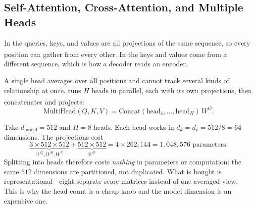 \subsection{Self-Attention, Cross-Attention, and Multiple Heads}

In  the queries, keys, and values are all projections of
the same sequence, so every position can gather from every
other\textsuperscript{\cite[][p.~79]{fleuretLittleBookDeep}}. In
 the keys and values come from a different sequence,
which is how a decoder reads an encoder.

A single head averages over all positions and cannot track several kinds of
relationship at once.  runs $H$ heads in
parallel, each with its own projections, then concatenates and
projects\textsuperscript{\cite[][pp.~4--5]{vaswaniAttentionAllYou2023}}:
\begin{equation}
  \mathrm{MultiHead}(Q,K,V)
  = \mathrm{Concat}(\mathrm{head}_1,\dots,\mathrm{head}_H)\,W^O .
  \label{eq:dl-multihead}
\end{equation}

\begin{workedexample}
Take $d_{\text{model}} = 512$ and $H = 8$ heads. Each head works in
$d_k = d_v = 512/8 = 64$ dimensions. The projections cost
\[
  \underbrace{3 \times 512 \times 512}_{W^Q, W^K, W^V}
  + \underbrace{512 \times 512}_{W^O}
  = 4 \times 262{,}144 = 1{,}048{,}576 \text{ parameters.}
\]
Splitting into heads therefore costs \emph{nothing} in parameters or
computation: the same $512$ dimensions are partitioned, not duplicated. What is
bought is representational---eight separate score matrices instead of one
averaged view. This is why the head count is a cheap knob and the model
dimension is an expensive one.
\end{workedexample}

